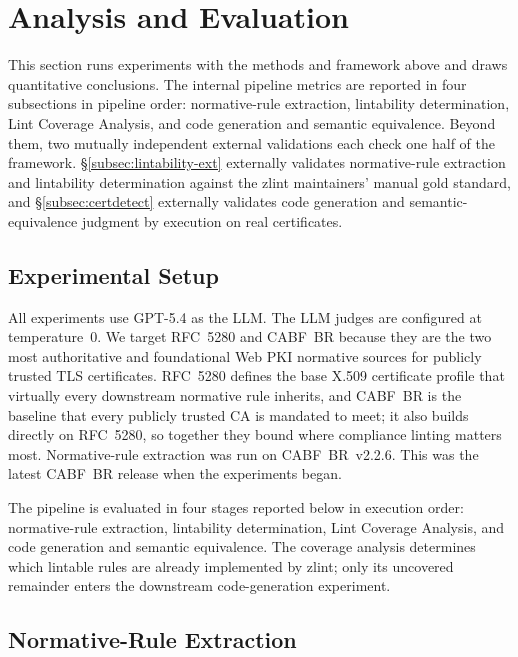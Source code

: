 \section{Analysis and Evaluation}
\label{sec:eval}

This section runs experiments with the methods and framework above and draws
quantitative conclusions. The internal pipeline metrics are reported in four
subsections in pipeline order: normative-rule extraction, lintability
determination, Lint Coverage Analysis, and code generation and semantic
equivalence. Beyond them, two mutually independent external validations
each check one half of the framework. \S\ref{subsec:lintability-ext} externally
validates normative-rule extraction and lintability determination against the
zlint maintainers' manual gold standard, and \S\ref{subsec:certdetect} externally
validates code generation and semantic-equivalence judgment by execution on real
certificates.

\subsection{Experimental Setup}
\label{subsec:setup}

All experiments use GPT-5.4 as the LLM. The LLM judges are configured at temperature~$0$. We target
RFC~5280 and CABF~BR because they are
the two most authoritative and foundational Web PKI normative sources for publicly
trusted TLS certificates. RFC~5280 defines the base X.509 certificate profile that
virtually every downstream normative rule inherits, and CABF~BR is the baseline that every
publicly trusted CA is mandated to meet; it also builds directly on RFC~5280, so
together they bound where compliance linting matters most. Normative-rule extraction was run on CABF~BR~v2.2.6. This was the latest
CABF~BR release when the experiments began.

The pipeline is evaluated in four stages reported below in execution order:
normative-rule extraction, lintability determination, Lint Coverage Analysis,
and code generation and semantic equivalence. The coverage analysis determines
which lintable rules are already implemented by zlint; only its uncovered
remainder enters the downstream code-generation experiment.

\subsection{Normative-Rule Extraction}
\label{subsec:rule-extraction}

